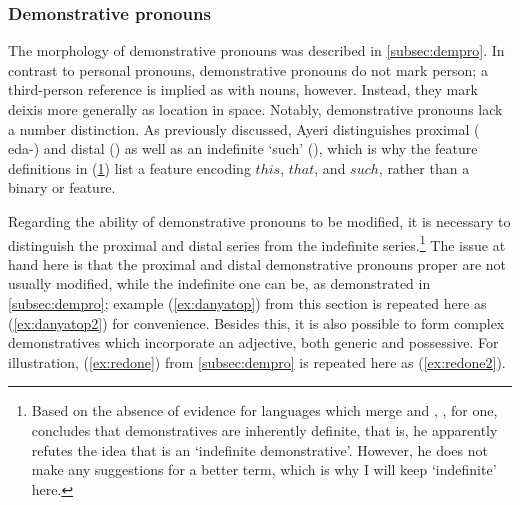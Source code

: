 
\subsubsection{Demonstrative pronouns}
\label{subsubsec:demprosyn}

The morphology of demonstrative pronouns was described in 
\autoref{subsec:dempro}. In contrast to personal pronouns, demonstrative
pronouns do not mark person; a third-person reference is implied as with
nouns, however. Instead, they mark deixis more generally as location in space.
Notably, demonstrative pronouns lack a number distinction. As previously
discussed, Ayeri distinguishes proximal ( {eda-}) and distal
() as well as an indefinite `such' (), which is
why the feature definitions in (\ref{ex:dempromorphlex}) list a \Deix{} feature
encoding $this$, $that$, and $such$, rather than a binary \Prox{} or \Dist{}
feature.

\begin{figure}
\begin{morphlex}
\ex\label{ex:dempromorphlex}
\xe
\end{morphlex}
\end{figure}

Regarding the ability of demonstrative pronouns to be modified, it is
necessary to distinguish the proximal  and distal
series from the indefinite series.\footnote{Based
on the absence of evidence for languages which merge  and ,
\citet[152]{lyons1999}, for one, concludes that demonstratives are inherently
definite, that is, he apparently refutes the idea that  is an
`indefinite demonstrative'. However, he does not make any suggestions for a
better term, which is why I will keep `indefinite' here.} The issue at hand
here is that the proximal and distal demonstrative pronouns proper are not
usually modified, while the indefinite one can be, as demonstrated in
\autoref{subsec:dempro}; example (\ref{ex:danyatop}) from this section is
repeated here as (\ref{ex:danyatop2}) for convenience. Besides this, it is also
possible to form complex demonstratives which incorporate an adjective, both
generic and possessive. For illustration, (\ref{ex:redone}) from
\autoref{subsec:dempro} is repeated here as (\ref{ex:redone2}).

